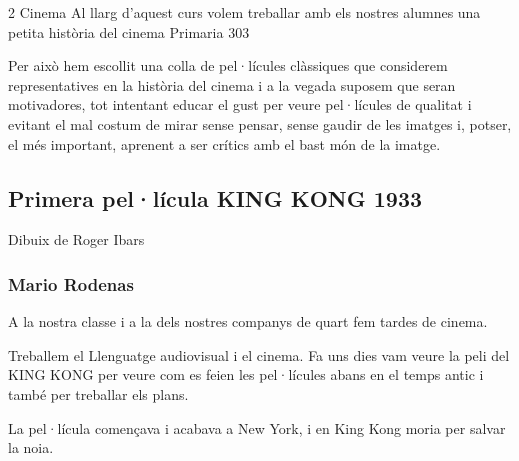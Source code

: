\begin{news}
{2} %
{Cinema}
{Al llarg d’aquest curs volem treballar amb els nostres alumnes una petita història del cinema}
{Primaria}
{303} %

Per això hem escollit una colla de pel·lícules clàssiques que considerem representatives en la història del cinema i a la vegada suposem que  seran motivadores, tot intentant educar el gust per veure pel·lícules de qualitat i evitant el mal costum de mirar sense pensar, sense gaudir de  les imatges i, potser, el més important, aprenent a ser crítics amb el bast món de la imatge.

\subsection*{Primera pel·lícula KING KONG 1933}

\noindent{}

Dibuix de Roger Ibars

\subsubsection*{Mario Rodenas}

A la nostra classe i a la dels nostres companys de quart fem tardes de cinema.

Treballem el Llenguatge audiovisual i el cinema. Fa uns dies vam veure la peli del KING KONG per veure com es feien les pel·lícules abans en el temps antic i també per treballar els plans.

La pel·lícula començava i acabava a New York, i en King Kong moria per salvar la noia.



\noindent{}


\end{news}
